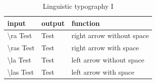 

\begin{table}[ht!]
\centering
	\begin{tabular}{l|l|l}
		\textbf{input} & \textbf{output} & \textbf{function} \\
		\midrule
		\textbackslash ra Test & \ra Test & right arrow without space \\
		\textbackslash ras Test & \ras Test & right arrow with space \\
		\textbackslash la Test & \la Test & left arrow without space  \\
		\textbackslash las Test & \las Test & left arrow with space \\
	\end{tabular}
\caption{Linguistic typography I}
\end{table}



